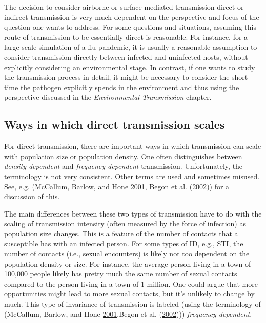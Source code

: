 \documentclass[]{article}
\theoremstyle{definition}
\theoremstyle{definition}
\theoremstyle{definition}
\theoremstyle{remark}
\begin{document}
The decision to consider airborne or surface mediated transmission
direct or indirect transmission is very much dependent on the
perspective and focus of the question one wants to address. For some
questions and situations, assuming this route of transmission to be
essentially direct is reasonable. For instance, for a large-scale
simulation of a flu pandemic, it is usually a reasonable assumption to
consider transmission directly between infected and uninfected hosts,
without explicitly considering an environmental stage. In contrast, if
one wants to study the transmission process in detail, it might be
necessary to consider the short time the pathogen explicitly spends in
the environment and thus using the perspective discussed in the
\emph{Environmental Transmission} chapter.

\subsection{Ways in which direct transmission
scales}\label{ways-in-which-direct-transmission-scales}

For direct transmission, there are important ways in which transmission
can scale with population size or population density. One often
distinguishes between \emph{density-dependent} and
\emph{frequency-dependent} transmission. Unfortunately, the terminology
is not very consistent. Other terms are used and sometimes misused. See,
e.g. (McCallum, Barlow, and Hone
\protect\hyperlink{ref-mccallum01}{2001}, Begon et al.
(\protect\hyperlink{ref-begon02}{2002})) for a discussion of this.

The main differences between these two types of transmission have to do
with the scaling of transmission intensity (often measured by the force
of infection) as population size changes. This is a feature of the
number of contacts that a susceptible has with an infected person. For
some types of ID, e.g., STI, the number of contacts (i.e., sexual
encounters) is likely not too dependent on the population density or
size. For instance, the average person living in a town of 100,000
people likely has pretty much the same number of sexual contacts
compared to the person living in a town of 1 million. One could argue
that more opportunities might lead to more sexual contacts, but it's
unlikely to change by much. This type of invariance of transmission is
labeled (using the terminology of (McCallum, Barlow, and Hone
\protect\hyperlink{ref-mccallum01}{2001},Begon et al.
(\protect\hyperlink{ref-begon02}{2002}))) \emph{frequency-dependent}.
\end{document}
